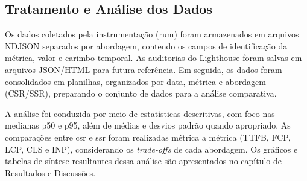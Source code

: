 \subsection{Tratamento e Análise dos Dados}

Os dados coletados pela instrumentação (\acrshort{rum}) foram armazenados em arquivos NDJSON separados por abordagem, contendo os campos de identificação da métrica, valor e carimbo temporal. As auditorias do Lighthouse foram salvas em arquivos JSON/HTML para futura referência. Em seguida, os dados foram consolidados em planilhas, organizados por data, métrica e abordagem (CSR/SSR), preparando o conjunto de dados para a análise comparativa.

A análise foi conduzida por meio de estatísticas descritivas, com foco nas medianas p50 e p95, além de médias e desvios padrão quando apropriado. As comparações entre \acrshort{csr} e \acrshort{ssr} foram realizadas métrica a métrica (TTFB, FCP, LCP, CLS e INP), considerando os \textit{trade-offs} de cada abordagem. Os gráficos e tabelas de síntese resultantes dessa análise são apresentados no capítulo de Resultados e Discussões.